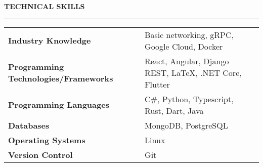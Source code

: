 \noindent\textcolor{themecolor}{\textbf{TECHNICAL SKILLS}}

\vspace{2mm}
\hrule

\begin{table}[h]
\begin{tabular}{ >{\bfseries} l l }
    Industry Knowledge & Basic networking, gRPC, Google Cloud, Docker \\
    Programming Technologies/Frameworks & React, Angular, Django REST, \LaTeX, .NET Core, Flutter\\
    Programming Languages & C\#, Python, Typescript, Rust, Dart, Java\\
    Databases & MongoDB, PostgreSQL\\
    Operating Systems & Linux\\
    Version Control & Git
\end{tabular}
\end{table}